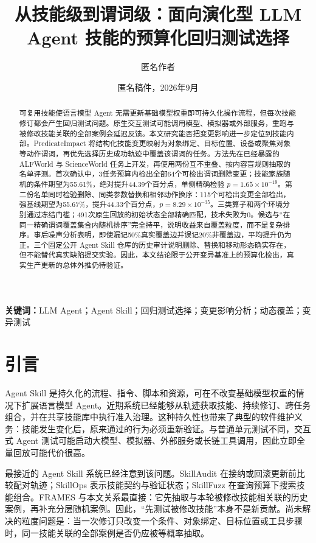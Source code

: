 \documentclass[10pt]{article}
\title{从技能级到谓词级：面向演化型 LLM Agent 技能的预算化回归测试选择}
\author{匿名作者}
\date{匿名稿件，2026年9月}
\begin{document}
\maketitle

\begin{abstract}
可复用技能使语言模型 Agent 无需更新基础模型权重即可持久化操作流程，但每次技能修订都会产生回归测试问题。原生交互测试可能调用模型、模拟器或外部服务，重跑与被修改技能关联的全部案例会延迟反馈。本文研究能否把变更影响进一步定位到技能内部。PredicateImpact 将结构化技能变更映射为对象绑定、目标位置、设备或聚焦对象等动作谓词，再优先选择历史成功轨迹中覆盖该谓词的任务。方法先在已经暴露的 ALFWorld 与 ScienceWorld 任务上开发，再使用两份互不重叠、按内容盲规则抽取的名单评测。首次确认中，3任务预算内检出全部64个可检出谓词删除变更；技能家族随机的条件期望为55.61\%，绝对提升44.39个百分点，单侧精确检验 $p=1.65\times10^{-19}$。第二份名单同时检验删除、同类参数替换和相邻动作换序：115个可检出变更全部检出，强基线期望为55.67\%，提升44.33个百分点，$p=8.29\times10^{-35}$。三类算子和两个环境分别通过冻结门槛；491次原生回放的初始状态全部精确匹配，技术失败为0。候选与“在同一精确谓词覆盖集合内随机排序”完全持平，说明收益来自覆盖粒度，而不是复杂排序。事后噪声分析表明，即使漏记50\%真实覆盖边并误记20\%非覆盖边，平均提升仍为正。三个固定公开 Agent Skill 仓库的历史审计说明删除、替换和移动形态确实存在，但不能替代真实缺陷提交实验。因此，本文结论限于公开变异基准上的预算化检出，真实生产更新的总体外推仍待验证。
\end{abstract}

\noindent\textbf{关键词：}LLM Agent；Agent Skill；回归测试选择；变更影响分析；动态覆盖；变异测试

\section{引言}
Agent Skill 是持久化的流程、指令、脚本和资源，可在不改变基础模型权重的情况下扩展语言模型 Agent。近期系统已经能够从轨迹获取技能、持续修订、跨任务组合，并在共享技能库中执行准入治理\citep{ye2026mce,lei2026skillevolbench,gao2026skillaudit,song2026skillops}。这种持久性也带来了典型的软件维护义务：技能发生变化后，原来通过的行为必须重新验证。与普通单元测试不同，交互式 Agent 测试可能启动大模型、模拟器、外部服务或长链工具调用，因此立即全量回放可能代价很高。

最接近的 Agent Skill 系统已经注意到该问题。SkillAudit 在接纳或回滚更新前比较配对轨迹\citep{gao2026skillaudit}；SkillOps 表示技能契约与验证状态\citep{song2026skillops}；SkillFuzz 在查询预算下搜索技能组合\citep{hu2026skillfuzz}。FRAMES 与本文关系最直接：它先抽取与本轮被修改技能相关联的历史案例，再补充分层随机案例\citep{wang2026frames}。因此，“先测试被修改技能”本身不是新贡献。尚未解决的粒度问题是：当一次修订只改变一个条件、对象绑定、目标位置或工具步骤时，同一技能关联的全部案例是否仍应被等概率抽取。
\end{document}
